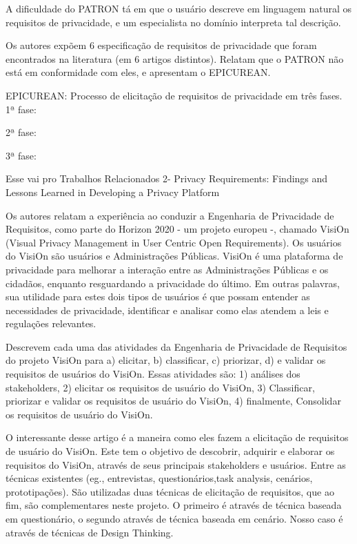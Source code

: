 A dificuldade do PATRON tá em que o usuário descreve em linguagem natural os requisitos de privacidade, e um especialista no domínio interpreta tal descrição.

Os autores expõem 6 especificação de requisitos de privacidade que foram encontrados na literatura (em 6 artigos distintos). Relatam que o PATRON não está em conformidade com eles, e apresentam o EPICUREAN.  


EPICUREAN: Processo de elicitação de requisitos de privacidade em três fases.
1ª fase:

2ª fase:

3ª fase:

Esse vai pro Trabalhos Relacionados
2- Privacy Requirements: Findings and Lessons Learned in Developing a Privacy Platform

Os autores relatam a experiência ao conduzir a Engenharia de Privacidade de Requisitos, como parte do Horizon 2020 - um projeto europeu -, chamado VisiOn (Visual Privacy Management in User Centric Open Requirements). Os usuários do VisiOn são usuários e Administrações Públicas. VisiOn é uma plataforma de privacidade para melhorar a interação entre as Administrações Públicas e os cidadãos, enquanto resguardando a privacidade do último. Em outras palavras, sua utilidade para estes dois tipos de usuários é que possam entender as necessidades de privacidade, identificar e analisar como elas atendem a leis e regulações relevantes.

Descrevem cada uma das atividades da Engenharia de Privacidade de Requisitos do projeto VisiOn para a) elicitar, b) classificar, c) priorizar, d) e validar os requisitos de usuários do VisiOn.  Essas atividades são: 1) análises dos stakeholders, 2) elicitar os requisitos de usuário do VisiOn, 3) Classificar, priorizar e validar os requisitos de usuário do VisiOn, 4) finalmente, Consolidar os requisitos de usuário do VisiOn.

O interessante desse artigo é a maneira como eles fazem a elicitação de requisitos de usuário do VisiOn. Este tem o objetivo de descobrir, adquirir e elaborar os requisitos do VisiOn, através de seus principais stakeholders e usuários. Entre as técnicas existentes (eg., entrevistas, questionários,task analysis, cenários, prototipações). São utilizadas duas técnicas de elicitação de requisitos, que ao fim, são complementares neste projeto. O primeiro é através de técnica baseada em questionário, o segundo através de técnica baseada em cenário. Nosso caso é através de técnicas de Design Thinking.

